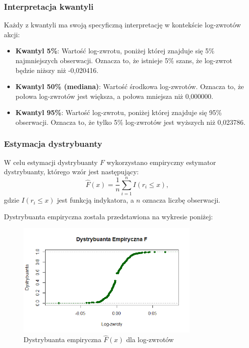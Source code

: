 \documentclass[a4paper,11pt]{article}
\begin{document}
\subsubsection{Interpretacja kwantyli}
Każdy z kwantyli ma swoją specyficzną interpretację w kontekście log-zwrotów akcji:
\begin{itemize}
    \item \textbf{Kwantyl 5\%}: Wartość log-zwrotu, poniżej której znajduje się 5\% najmniejszych obserwacji. Oznacza to, że istnieje 5\% szans, że log-zwrot będzie niższy niż -0,020416.
    \item \textbf{Kwantyl 50\% (mediana)}: Wartość środkowa log-zwrotów. Oznacza to, że połowa log-zwrotów jest większa, a połowa mniejsza niż 0,000000.
    \item \textbf{Kwantyl 95\%}: Wartość log-zwrotu, poniżej której znajduje się 95\% obserwacji. Oznacza to, że tylko 5\% log-zwrotów jest wyższych niż 0,023786.
\end{itemize}

\subsubsection{Estymacja dystrybuanty}
W celu estymacji dystrybuanty $F$ wykorzystano empiryczny estymator dystrybuanty, którego wzór jest następujący:
\begin{equation}
    \hat{F}(x) = \frac{1}{n} \sum_{i=1}^{n} I(r_i \leq x),
\end{equation}
 gdzie $I(r_i \leq x)$ jest funkcją indykatora, a $n$ oznacza liczbę obserwacji.

Dystrybuanta empiryczna została przedstawiona na wykresie poniżej:

\begin{figure}[H]
    \centering
    \includegraphics[width=0.8\textwidth]{./Wojtek/dystrybuanta-empiryczna.png}
    \caption{Dystrybuanta empiryczna $\hat{F}(x)$ dla log-zwrotów}
    \label{fig:dystrybuanta_empiryczna}
\end{figure}
\end{document}
